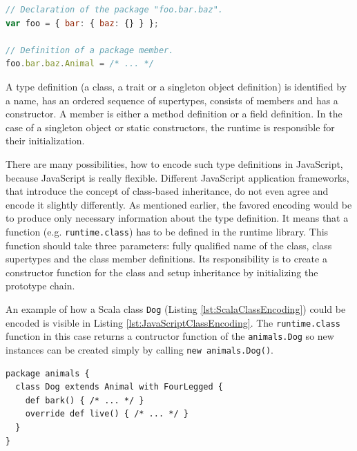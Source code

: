 \documentclass[12pt,a4paper]{report}
\begin{document}
\begin{minipage}{\linewidth}
\begin{lstlisting}[language=JavaScript,caption={Packages in JavaScript.},label={lst:JavaScriptPackages}]
// Declaration of the package "foo.bar.baz".
var foo = { bar: { baz: {} } };

// Definition of a package member.
foo.bar.baz.Animal = /* ... */
\end{lstlisting}
\end{minipage}

A type definition (a class, a trait or a singleton object definition) is identified by a name, has an ordered sequence of supertypes, consists of members and has a constructor. A member is either a method definition or a field definition. In the case of a singleton object or static constructors, the runtime is responsible for their initialization.

There are many possibilities, how to encode such type definitions in JavaScript, because JavaScript is really flexible. Different JavaScript application frameworks, that introduce the concept of class-based inheritance, do not even agree and encode it slightly differently. As mentioned earlier, the favored encoding would be to produce only necessary information about the type definition. It means that a function (e.g. \texttt{runtime.class}) has to be defined in the runtime library. This function should take three parameters: fully qualified name of the class, class supertypes and the class member definitions. Its responsibility is to create a constructor function for the class and setup inheritance by initializing the prototype chain. 

An example of how a Scala class \texttt{Dog} (Listing \ref{lst:ScalaClassEncoding}) could be encoded is visible in Listing \ref{lst:JavaScriptClassEncoding}. The \texttt{runtime.class} function in this case returns a contructor function of the \texttt{animals.Dog} so new instances can be created simply by calling \texttt{new animals.Dog()}.

\begin{minipage}{\linewidth}
\begin{lstlisting}[caption={Scala \texttt{Dog} class example.},label={lst:ScalaClassEncoding}]
package animals {
  class Dog extends Animal with FourLegged {
    def bark() { /* ... */ }
    override def live() { /* ... */ }
  }
}
\end{lstlisting}
\end{minipage}
\end{document}
